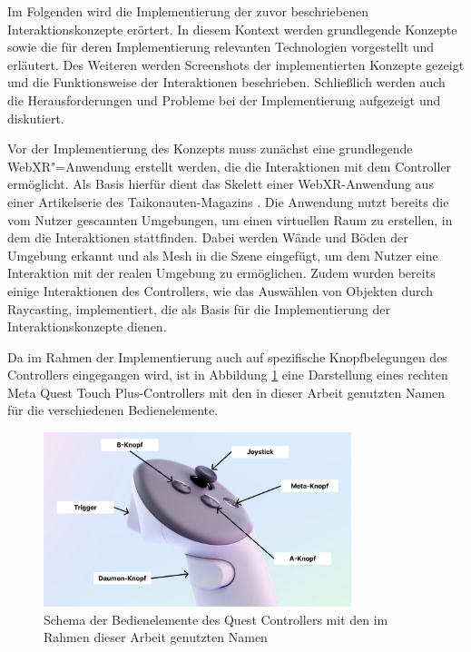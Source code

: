 Im Folgenden wird die Implementierung der zuvor beschriebenen Interaktionskonzepte erörtert.
In diesem Kontext werden grundlegende Konzepte sowie die für deren Implementierung relevanten Technologien vorgestellt und erläutert.
Des Weiteren werden Screenshots der implementierten Konzepte gezeigt und die Funktionsweise der Interaktionen beschrieben.
Schließlich werden auch die Herausforderungen und Probleme bei der Implementierung aufgezeigt und diskutiert.

Vor der Implementierung des Konzepts muss zunächst eine grundlegende WebXR"=Anwendung erstellt werden, die die Interaktionen mit dem Controller ermöglicht.
Als Basis hierfür dient das Skelett einer WebXR-Anwendung aus einer Artikelserie des Taikonauten-Magazins \autocite[][]{taikonauten-magazine}. 
Die Anwendung nutzt bereits die vom Nutzer gescannten Umgebungen, um einen virtuellen Raum zu erstellen, in dem die Interaktionen stattfinden.
Dabei werden Wände und Böden der Umgebung erkannt und als Mesh in die Szene eingefügt, um dem Nutzer eine Interaktion mit der realen Umgebung zu ermöglichen.
Zudem wurden bereits einige Interaktionen des Controllers, wie das Auswählen von Objekten durch Raycasting, implementiert, die als Basis für die Implementierung der Interaktionskonzepte dienen.

Da im Rahmen der Implementierung auch auf spezifische Knopfbelegungen des Controllers eingegangen wird, ist in Abbildung \ref{fig:controller-names} eine Darstellung eines rechten Meta Quest Touch Plus-Controllers mit den in dieser Arbeit genutzten Namen für die verschiedenen Bedienelemente.

\begin{figure}[H]
    \centering
    \includegraphics[width=0.8\textwidth]{images/QuestControllerButtons.png}
    \caption{Schema der Bedienelemente des Quest Controllers mit den im Rahmen dieser Arbeit genutzten Namen}
    \label{fig:controller-names}
\end{figure}

